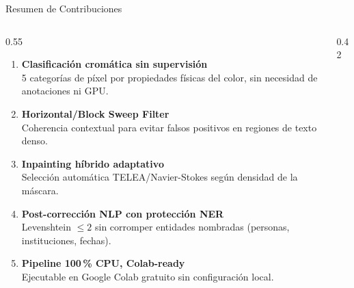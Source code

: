 \documentclass[aspectratio=169, 11pt]{beamer}
\newcommand{\rojo}[1]{\textcolor{PriRed}{#1}}
\newcommand{\verde}[1]{\textcolor{AccGreen}{#1}}
\newcommand{\amber}[1]{\textcolor{AccAmber}{#1}}
\begin{document}
\begin{frame}{Resumen de Contribuciones}
  \begin{columns}[T]
    \begin{column}{0.55\textwidth}
      \begin{enumerate}[label=\rojo{\textbf{\arabic*.}}, leftmargin=1.5em, itemsep=8pt]
        \item \textbf{Clasificación cromática sin supervisión}\\
              5 categorías de píxel por propiedades físicas del color,
              sin necesidad de anotaciones ni GPU.

        \item \textbf{Horizontal/Block Sweep Filter}\\
              Coherencia contextual para evitar falsos positivos
              en regiones de texto denso.

        \item \textbf{Inpainting híbrido adaptativo}\\
              Selección automática TELEA/Navier-Stokes según
              densidad de la máscara.

        \item \textbf{Post-corrección NLP con protección NER}\\
              Levenshtein $\leq 2$ sin corromper entidades nombradas
              (personas, instituciones, fechas).

        \item \textbf{Pipeline 100\,\% CPU, Colab-ready}\\
              Ejecutable en Google Colab gratuito sin configuración local.
      \end{enumerate}
    \end{column}
    \begin{column}{0.42\textwidth}
      \centering\vspace{10pt}

      \vspace{12pt}
    \end{column}
  \end{columns}
\end{frame}
\end{document}
